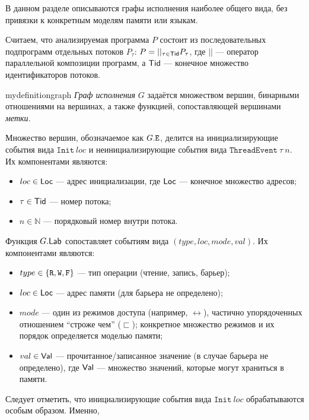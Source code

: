 В данном разделе описываются графы исполнения наиболее общего вида, без привязки к конкретным моделям памяти или языкам. 

Считаем, что анализируемая программа $P$ состоит из последовательных подпрограмм отдельных потоков $P_\tau$: $P = ||_{\tau\in \mathsf{Tid}} P_\tau$, где $||$ --- оператор параллельной композиции программ, а $\mathsf{Tid}$ --- конечное множество идентификаторов потоков.

\begin{restatable}{mydefinition}{graph}
  \emph{Граф исполнения} $G$ задаётся множеством вершин, бинарными отношениями на вершинах, а также функцией, сопоставляющей вершинами \emph{метки}. 
\end{restatable}
  
  Множество вершин, обозначаемое как $G.{\mathtt{E}}$, делится на инициализирующие события вида $\mathtt{Init}\ loc$ и неинициализирующие события вида $\mathtt{ThreadEvent}\ \tau\ n$. Их компонентами являются:
  \begin{itemize}
  \item $loc \in \mathsf{Loc}$ --- адрес инициализации, где $\mathsf{Loc}$ --- конечное множество адресов;
  \item $\tau \in \mathsf{Tid}$ --- номер потока;
  \item $n\in \mathbb{N}$ --- порядковый номер внутри потока.
  \end{itemize}
    
Функция $G.\mathsf{Lab}$ сопоставляет событиям  вида $(type, loc, mode, val)$. Их компонентами являются:
\begin{itemize}
\item $type \in \{{\mathtt{R}}, {\mathtt{W}}, {\mathtt{F}}\}$ --- тип операции (чтение, запись, барьер);
\item $loc \in \mathsf{Loc}$ --- адрес памяти (для барьера не определено);
\item $mode$ --- один из режимов доступа (например, $\rel$), частично упорядоченных отношением ``строже чем'' ($\sqsubset$); конкретное множество режимов и их порядок определяется моделью памяти;
\item $val\in \mathsf{Val}$ --- прочитанное/записанное значение (в случае барьера не определено), где $\mathsf{Val}$ --- множество значений, которые могут храниться в памяти.
\end{itemize}

Следует отметить, что инициализирующие события вида $\mathtt{Init}\ loc$ обрабатываются особым образом. Именно,

